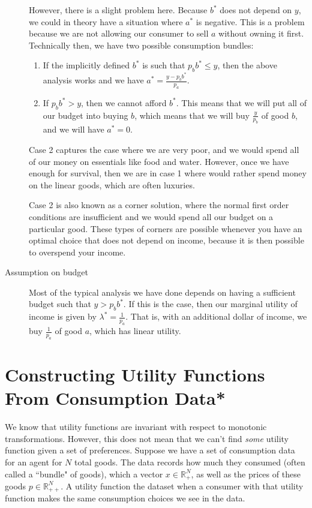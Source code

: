 \begin{description}
    However, there is a slight problem here. Because $b^*$ does not depend on $y$, we could in theory have a situation where $a^*$ is negative. This is a problem because we are not allowing our consumer to sell $a$ without owning it first. Technically then, we have two possible consumption bundles:
    \begin{enumerate}
        \item If the implicitly defined $b^*$ is such that $p_b b^* \leq y$, then the above analysis works and we have $a^* = \frac{y - p_b b^*}{p_a}$.
        \item If $p_b b^* > y$, then we cannot afford $b^*$. This means that we will put all of our budget into buying $b$, which means that we will buy $\frac{y}{p_b}$ of good $b$, and we will have $a^* = 0$.  
   \end{enumerate}
   Case 2 captures the case where we are very poor, and we would spend all of our money on essentials like food and water. However, once we have enough for survival, then we are in case 1 where would rather spend money on the linear goods, which are often luxuries.

   Case 2 is also known as a corner solution, where the normal first order conditions are insufficient and we would spend all our budget on a particular good. These types of corners are possible whenever you have an optimal choice that does not depend on income, because it is then possible to overspend your income. 
   
   \item[Assumption on budget] Most of the typical analysis we have done depends on having a sufficient budget such that $y > p_b b^*$. If this is the case, then our marginal utility of income is given by $\lambda^* = \frac{1}{p_a}$. That is, with an additional dollar of income, we buy $\frac{1}{p_a}$ of good $a$, which has linear utility.
\end{description}
\section{Constructing Utility Functions From Consumption Data*}
We know that utility functions are invariant with respect to monotonic transformations. However, this does not mean that we can't find \emph{some} utility function given a set of preferences. Suppose we have a set of consumption data for an agent for $N$ total goods. The data records how much they consumed (often called a ``bundle" of goods), which a vector $x \in \mathbb{R}^N_+$, as well as the prices of these goods $p \in \mathbb{R}^N_{++}$. A utility function  the dataset when a consumer with that utility function makes the same consumption choices we see in the data.

